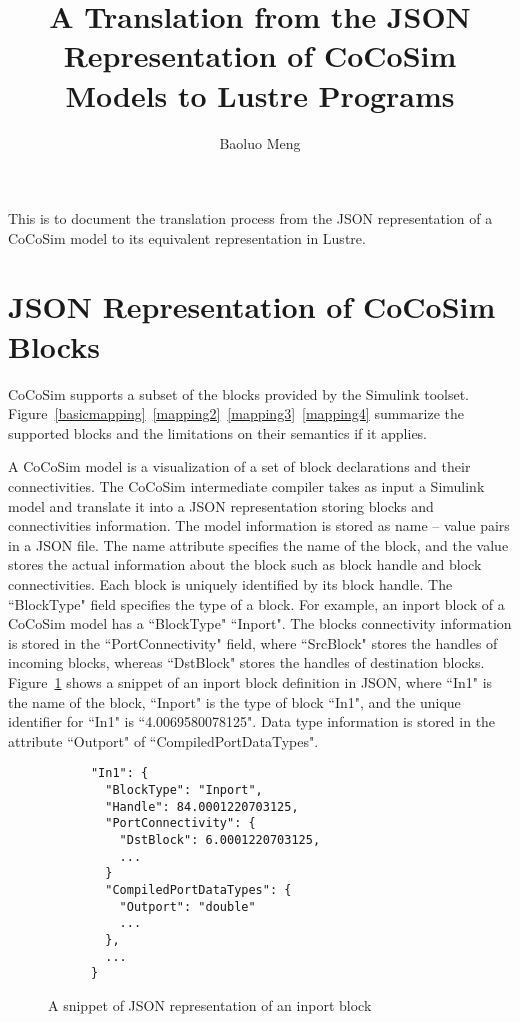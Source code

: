 \documentclass{article}
\begin{document}
\title{A Translation from the JSON Representation of CoCoSim Models to Lustre Programs}

\author{Baoluo Meng}


\maketitle

This is to document the translation process from the JSON representation of a CoCoSim model to its equivalent representation in Lustre.


\section{JSON Representation of CoCoSim Blocks}

CoCoSim supports a subset of the blocks provided by the Simulink toolset. Figure~\ref{basicmapping}~\ref{mapping2}~\ref{mapping3}~\ref{mapping4} summarize the supported blocks and the limitations on their semantics if it applies. 

A CoCoSim model is a visualization of a set of block declarations and their connectivities.
The CoCoSim intermediate compiler takes as input a Simulink model and translate it into a JSON representation storing blocks and connectivities information. 
The model information is stored as name -- value pairs in a JSON file. 
The name attribute specifies the name of the block, and the value stores the actual information about the block such as block handle and block connectivities. 
Each block is uniquely identified by its block handle.
The ``BlockType" field specifies the type of a block. 
For example, an inport block of a CoCoSim model has a ``BlockType" ``Inport".
The blocks connectivity information is stored in the ``PortConnectivity" field, where ``SrcBlock" stores the handles of incoming blocks, whereas ``DstBlock" stores the handles of destination blocks. 
Figure~\ref{jsoninport} shows a snippet of an inport block definition in JSON, 
where ``In1" is the name of the block, ``Inport" is the type of block ``In1", and the unique identifier for ``In1" is ``4.0069580078125". Data type information is stored in the attribute ``Outport" of ``CompiledPortDataTypes". 

\begin{figure}[ht]
\begin{lstlisting}
      "In1": {
        "BlockType": "Inport",
        "Handle": 84.0001220703125,
        "PortConnectivity": {
          "DstBlock": 6.0001220703125,
          ...
        }
        "CompiledPortDataTypes": {
          "Outport": "double"
          ...
        },
        ...        
      }
\end{lstlisting}        
\caption{A snippet of JSON representation of an inport block}
\label{jsoninport}
\end{figure}
\end{document}
